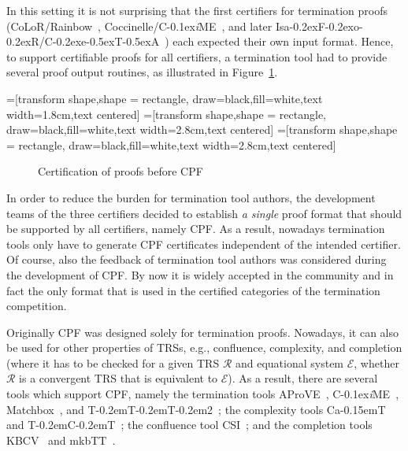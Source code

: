 \documentclass[USenglish]{eptcs}
\newcommand\aprove{\textsf{AProVE}\xspace}
\newcommand\matchbox{\textsf{Matchbox}\xspace}
\newcommand\cime{\textsf{C\kern-0.1ex\textsl{i}ME}\xspace}
\newcommand\tttt{\textsf{T\kern-0.2em\raisebox{-0.3em}T\kern-0.2emT\kern-0.2em\raisebox{-0.3em}2}\xspace}
\newcommand{\csi}{\textsf{CSI}\xspace}
\newcommand\tct{\textsf{T\kern-0.2em\raisebox{-0.3em}C\kern-0.2emT}\xspace}
\newcommand{\cat}{\textsf{C\raisebox{0.15em}a\kern-0.15emT}\xspace}
\newcommand{\kbcv}{\textsf{KBCV}\xspace}
\newcommand{\mkbtt}{\textsf{mkbTT}\xspace}
\newlength{\len}
\newcommand\EE{\ensuremath{\mathcal{E}}\xspace}
\newcommand\RR{\ensuremath{\mathcal{R}}\xspace}
\newcommand{\rFI}[1]{Figure~\ref{#1}}
\newcommand\rainbow{\textsf{Rainbow}\xspace}
\newcommand\colorr{\textsf{CoLoR}\xspace}
\newcommand\cocci{\textsf{Coccinelle}\xspace}
\newcommand\isafor{\textsf{Isa\kern-0.2exF\kern-0.2exo\kern-0.2exR}\xspace}
\newcommand\ceta{\textsf{C\kern-0.2exe\kern-0.5exT\kern-0.5exA}\xspace}
\newcommand\colrain{\colorr/\rainbow}
\newcommand\coccime{\cocci/\cime}
\newcommand\isaceta{\isafor/\ceta}
\begin{document}
In this setting it is not surprising that the first certifiers for
termination proofs (\colrain~\cite{color}, \coccime~\cite{a3pat-cime}, and later
\isaceta~\cite{ceta-tphols}) each expected their own input format.  Hence, to
support certifiable proofs for all certifiers, a termination tool had to provide
several proof output routines, as illustrated in \rFI{before}. 

=[transform shape,shape = rectangle, draw=black,fill=white,text width=1.8cm,text centered] 
=[transform shape,shape = rectangle, draw=black,fill=white,text width=2.8cm,text centered] 
=[transform shape,shape = rectangle, draw=black,fill=white,text width=2.8cm,text centered] 

\begin{figure}
\centering
{}
\caption{\label{before}Certification of proofs before CPF}
\end{figure}

In order to reduce the burden for termination tool authors, the development
teams of the three certifiers decided to establish \emph{a single} proof
format that should be supported by all certifiers, namely CPF.  As a result,
nowadays termination tools only have to generate CPF certificates independent of
the intended certifier.  Of course, also the feedback of termination tool
authors was considered during the development of CPF. By now it is widely
accepted in the community and in fact the only format that is used in the
certified categories of the termination competition. 

Originally CPF was designed solely for termination proofs. Nowadays, it can also
be used for other properties of TRSs, e.g., confluence, complexity, and
completion (where it has to be checked for a given TRS $\RR$ and equational
system $\EE$, whether $\RR$ is a convergent TRS that is equivalent to $\EE$). As
a result, there are several tools which support CPF, namely the termination
tools
\aprove~\cite{aprove},
\cime~\cite{a3pat-cime},
\matchbox~\cite{matchbox}, and
\tttt~\cite{ttt2};
the complexity tools
\cat~\cite{cat} and \tct~\cite{tct};
the confluence tool \csi~\cite{csi};
and the completion tools \kbcv~\cite{kbcv} and \mkbtt~\cite{mkbtt}.
\end{document}
